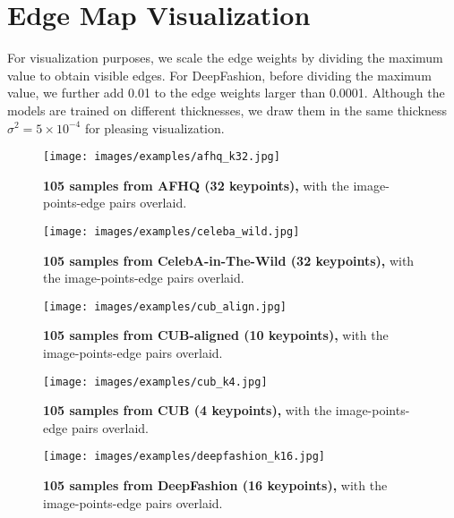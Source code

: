 \documentclass{article}
\begin{document}
\section{Edge Map Visualization}
For visualization purposes, we scale the edge weights by dividing the maximum value to obtain visible edges. For DeepFashion, before dividing the maximum value, we further add 0.01 to the edge weights larger than 0.0001. Although the models are trained on different thicknesses, we draw them in the same thickness $\sigma^2=5\times 10^{-4}$ for pleasing visualization.
 \begin{figure*}[t]
\begin{center}
   \texttt{[image: images/examples/afhq\_k32.jpg]}
\end{center}
   \caption{\textbf{105 samples from AFHQ (32 keypoints),} with the image-points-edge pairs overlaid.}
   \label{fig:gen_afhq_k32}
\end{figure*}

\begin{figure*}[t]
\begin{center}
   \texttt{[image: images/examples/celeba\_wild.jpg]}
\end{center}
   \caption{\textbf{105 samples from CelebA-in-The-Wild (32 keypoints),} with the image-points-edge pairs overlaid.}
   \label{fig:gen_face_k32}
\end{figure*}

\begin{figure*}[t]
\begin{center}
   \texttt{[image: images/examples/cub\_align.jpg]}
\end{center}
   \caption{\textbf{105 samples from CUB-aligned (10 keypoints),} with the image-points-edge pairs overlaid.}
\end{figure*}

\begin{figure*}[t]
\begin{center}
   \texttt{[image: images/examples/cub\_k4.jpg]}
\end{center}
   \caption{\textbf{105 samples from CUB (4 keypoints),} with the image-points-edge pairs overlaid.}
\end{figure*}

\begin{figure*}[t]
\begin{center}
   \texttt{[image: images/examples/deepfashion\_k16.jpg]}
\end{center}
   \caption{\textbf{105 samples from DeepFashion (16 keypoints),} with the image-points-edge pairs overlaid.}
   \label{fig:gen_deepfashion_k32}
\end{figure*}
\end{document}
